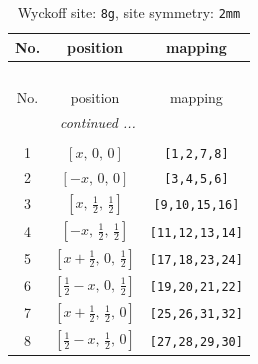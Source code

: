 \documentclass[fleqn,8pt]{jsarticle}
\begin{document}
\begin{longtable}{ccc}
\caption{Wyckoff site: {\tt 8g}, site symmetry: {\tt 2mm}}
 \\
 \hline \hline
No. & position & mapping \\ \hline \endfirsthead

\multicolumn{2}{l}{\tablename\ \thetable{}} \\
 \hline \hline
No. & position & mapping \\ \hline \endhead

 \hline \hline
\multicolumn{2}{r}{\footnotesize\it continued ...} \\ \endfoot

 \hline \hline
\multicolumn{2}{r}{} \\ \endlastfoot

1 & $\left[ x,\, 0,\, 0 \right]$ & {\tt [1,2,7,8]} \\ \hline
2 & $\left[ - x,\, 0,\, 0 \right]$ & {\tt [3,4,5,6]} \\ \hline
3 & $\left[ x,\, \frac{1}{2},\, \frac{1}{2} \right]$ & {\tt [9,10,15,16]} \\ \hline
4 & $\left[ - x,\, \frac{1}{2},\, \frac{1}{2} \right]$ & {\tt [11,12,13,14]} \\ \hline
5 & $\left[ x + \frac{1}{2},\, 0,\, \frac{1}{2} \right]$ & {\tt [17,18,23,24]} \\ \hline
6 & $\left[ \frac{1}{2} - x,\, 0,\, \frac{1}{2} \right]$ & {\tt [19,20,21,22]} \\ \hline
7 & $\left[ x + \frac{1}{2},\, \frac{1}{2},\, 0 \right]$ & {\tt [25,26,31,32]} \\ \hline
8 & $\left[ \frac{1}{2} - x,\, \frac{1}{2},\, 0 \right]$ & {\tt [27,28,29,30]} \\
\end{longtable}
\renewcommand{\arraystretch}{1.2}
\end{document}
